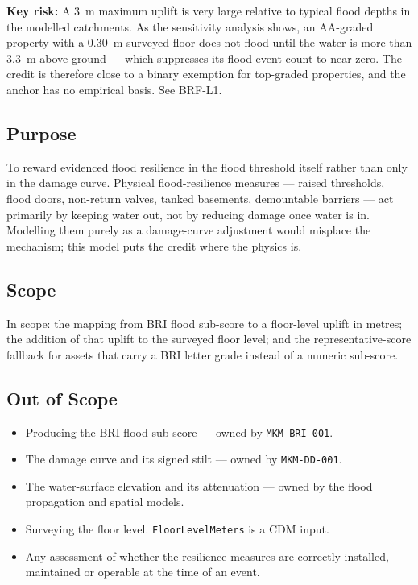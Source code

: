 \documentclass[11pt,a4paper]{article}
\begin{document}
\textbf{Key risk:} A 3~m maximum uplift is very large relative to typical flood
depths in the modelled catchments. As the sensitivity analysis shows, an
AA-graded property with a 0.30~m surveyed floor does not flood until the water
is more than 3.3~m above ground --- which suppresses its flood event count to
near zero. The credit is therefore close to a binary exemption for top-graded
properties, and the anchor has no empirical basis. See BRF-L1.

\mkmpurpose

\subsection{Purpose}
To reward evidenced flood resilience in the flood threshold itself rather than
only in the damage curve. Physical flood-resilience measures --- raised
thresholds, flood doors, non-return valves, tanked basements, demountable
barriers --- act primarily by keeping water out, not by reducing damage once
water is in. Modelling them purely as a damage-curve adjustment would misplace
the mechanism; this model puts the credit where the physics is.

\subsection{Scope}
In scope: the mapping from BRI flood sub-score to a floor-level uplift in
metres; the addition of that uplift to the surveyed floor level; and the
representative-score fallback for assets that carry a BRI letter grade instead
of a numeric sub-score.

\subsection{Out of Scope}
\begin{itemize}
  \item Producing the BRI flood sub-score --- owned by \texttt{MKM-BRI-001}.
  \item The damage curve and its signed stilt --- owned by
        \texttt{MKM-DD-001}.
  \item The water-surface elevation and its attenuation --- owned by the flood
        propagation and spatial models.
  \item Surveying the floor level. \texttt{FloorLevelMeters} is a CDM input.
  \item Any assessment of whether the resilience measures are correctly
        installed, maintained or operable at the time of an event.
\end{itemize}
\end{document}
